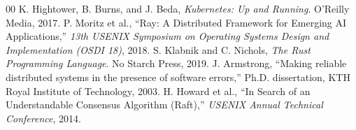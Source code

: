 \documentclass[conference,compsoc]{IEEEtran}
\begin{document}
\begin{thebibliography}{00}
 K. Hightower, B. Burns, and J. Beda, \emph{Kubernetes: Up and Running}. O'Reilly Media, 2017.
 P. Moritz et al., ``Ray: A Distributed Framework for Emerging AI Applications,'' \emph{13th USENIX Symposium on Operating Systems Design and Implementation (OSDI 18)}, 2018.
 S. Klabnik and C. Nichols, \emph{The Rust Programming Language}. No Starch Press, 2019.
 J. Armstrong, ``Making reliable distributed systems in the presence of software errors,'' Ph.D. dissertation, KTH Royal Institute of Technology, 2003.
 H. Howard et al., ``In Search of an Understandable Consensus Algorithm (Raft),'' \emph{USENIX Annual Technical Conference}, 2014.
\end{thebibliography}
\end{document}
